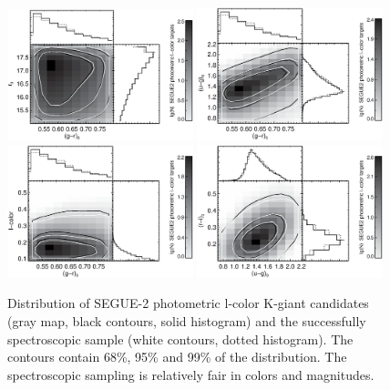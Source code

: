 \documentclass[12pt,preprint]{aastex}
\begin{document}
\begin{figure}[htbp]
\centering
\includegraphics[width=0.48\textwidth,height=0.3\textheight]{gmrvsr0_lctarget}
\includegraphics[width=0.48\textwidth,height=0.3\textheight]{gmrvsumg_lctarget}
\includegraphics[width=0.48\textwidth,height=0.3\textheight]{gmrvslcolor_lctarget}
\includegraphics[width=0.48\textwidth,height=0.3\textheight]{umgvsrmi_lctarget}

\caption{Distribution of SEGUE-2 photometric l-color K-giant candidates (gray map, black contours, solid histogram) and the successfully spectroscopic sample (white contours, dotted histogram). The contours contain 68\%, 95\% and 99\% of the distribution. The spectroscopic sampling is relatively fair in colors and magnitudes.}
\label{f:flkgbias}
\end{figure}
\end{document}
